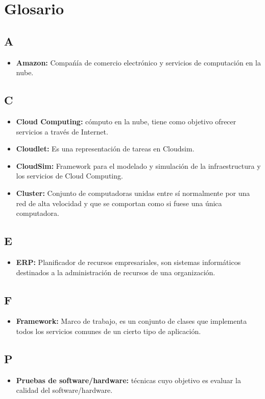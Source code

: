 \chead{}
\rhead{\thepage}

\chapter*{Glosario}
\section*{A}
\begin{itemize}
	\item \textbf{Amazon:} Compa\'n\'ia de comercio electr\'onico y servicios de computaci\'on en la nube.
\end{itemize}

\section*{C}

\begin{itemize}
	\item \textbf{Cloud Computing:} c\'omputo en la nube, tiene como objetivo ofrecer servicios a trav\'es de Internet.
	\item \textbf{Cloudlet:} Es una representaci\'on de tareas en Cloudsim.
	\item \textbf{CloudSim:} Framework para el modelado y simulaci\'on de la infraestructura y los servicios de Cloud Computing.
	\item \textbf{Cluster:} Conjunto de computadoras unidas entre s\'i normalmente por una red de alta velocidad y que se comportan como si fuese una \'unica computadora.
	
		
	
\end{itemize}
\section*{E}
\begin{itemize}
	\item \textbf{ERP:} Planificador de recursos empresariales, son sistemas inform\'aticos destinados a la administraci\'on de recursos de una organizaci\'on.
	
	
\end{itemize}


\section*{F}
\begin{itemize}
	\item \textbf{Framework:} Marco de trabajo, es un conjunto de clases que implementa todos los servicios comunes de un cierto tipo de aplicaci\'on.
\end{itemize}


\section*{P}
\begin{itemize}
	\item \textbf{Pruebas de software/hardware:} t\'ecnicas cuyo objetivo es evaluar la calidad del software/hardware.

\end{itemize}




